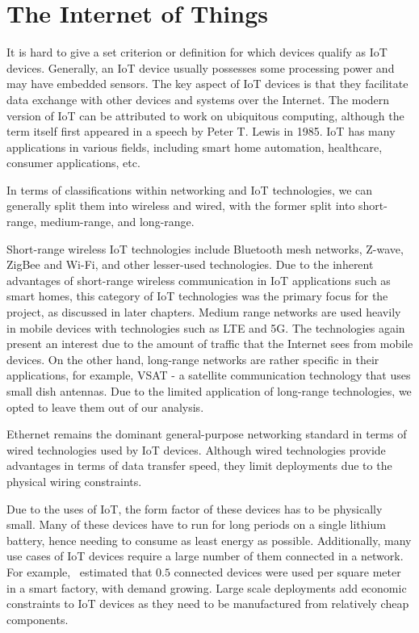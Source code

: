 \section{The Internet of Things}

It is hard to give a set criterion or definition for which devices qualify as IoT devices.
Generally, an IoT device usually possesses some processing power and may have embedded sensors.
The key aspect of IoT devices is that they facilitate data exchange with other devices and systems over the Internet.
The modern version of IoT can be attributed to work on ubiquitous computing, although the term itself first appeared in a speech by Peter T. Lewis in 1985.
IoT has many applications in various fields, including smart home automation, healthcare, consumer applications, etc.

In terms of classifications within networking and IoT technologies, we can generally split them into wireless and wired, with the former split into short-range, medium-range, and long-range.

Short-range wireless IoT technologies include Bluetooth mesh networks, Z-wave, ZigBee and Wi-Fi, and other lesser-used technologies.
Due to the inherent advantages of short-range wireless communication in IoT applications such as smart homes, this category of IoT technologies was the primary focus for the project, as discussed in later chapters.
Medium range networks are used heavily in mobile devices with technologies such as LTE and 5G.
The technologies again present an interest due to the amount of traffic that the Internet sees from mobile devices.
On the other hand, long-range networks are rather specific in their applications, for example, VSAT - a satellite communication technology that uses small dish antennas.
Due to the limited application of long-range technologies, we opted to leave them out of our analysis.

Ethernet remains the dominant general-purpose networking standard in terms of wired technologies used by IoT devices.
Although wired technologies provide advantages in terms of data transfer speed, they limit deployments due to the physical wiring constraints.

Due to the uses of IoT, the form factor of these devices has to be physically small.
Many of these devices have to run for long periods on a single lithium battery, hence needing to consume as least energy as possible.
Additionally, many use cases of IoT devices require a large number of them connected in a network.
For example,~\cite{ericsson_iot_2018} estimated that $0.5$ connected devices were used per square meter in a smart factory, with demand growing.
Large scale deployments add economic constraints to IoT devices as they need to be manufactured from relatively cheap components.

